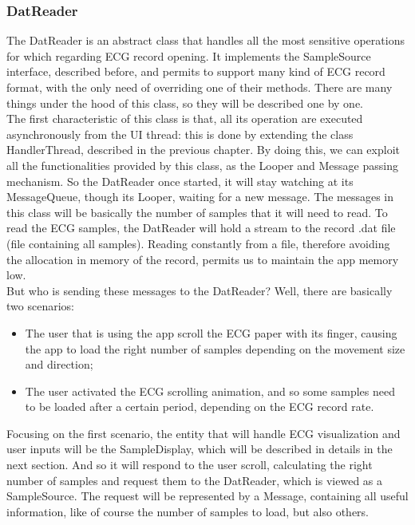 \subsubsection{DatReader}
The DatReader is an abstract class that handles all the most sensitive operations for which regarding ECG record opening. It implements the SampleSource interface, described before, and permits to support many kind of ECG record format, with the only need of overriding one of their methods. There are many things under the hood of this class, so they will be described one by one.\\
The first characteristic of this class is that, all its operation are executed asynchronously from the UI thread: this is done by extending the class HandlerThread, described in the previous chapter. By doing this, we can exploit all the functionalities provided by this class, as the Looper and Message passing mechanism. So the DatReader once started, it will stay watching at its MessageQueue, though its Looper, waiting for a new message. The messages in this class will be basically the number of samples that it will need to read. To read the ECG samples, the DatReader will hold a stream to the record .dat file (file containing all samples). Reading constantly from a file, therefore avoiding the allocation in memory of the record, permits us to maintain the app memory low.\\
But who is sending these messages to the DatReader? Well, there are basically two scenarios:
\begin{itemize}
	\item The user that is using the app scroll the ECG paper with its finger, causing the app to load the right number of samples depending on the movement size and direction;
	\item The user activated the ECG scrolling animation, and so some samples need to be loaded after a certain period, depending on the ECG record rate.
\end{itemize}
Focusing on the first scenario, the entity that will handle ECG visualization and user inputs will be the SampleDisplay, which will be described in details in the next section. And so it will respond to the user scroll, calculating the right number of samples and request them to the DatReader, which is viewed as a SampleSource. The request will be represented by a Message, containing all useful information, like of course the number of samples to load, but also others.\\
